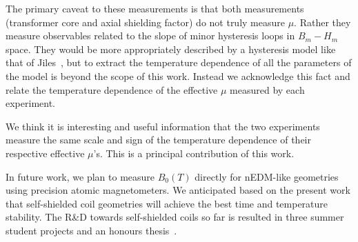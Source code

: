 The primary caveat to these measurements is that both measurements
(transformer core and axial shielding factor) do not truly measure
$\mu$.  Rather they measure observables related to the slope of minor
hysteresis loops in $B_m-H_m$ space.  They would be more appropriately
described by a hysteresis model like that of
Jiles~\cite{jiles1994frequency}, but to extract the temperature
dependence of all the parameters of the model is beyond the scope of
this work.  Instead we acknowledge this fact and relate the
temperature dependence of the effective $\mu$ measured by each
experiment.

We think it is interesting and useful information that the two
experiments measure the same scale and sign of the temperature
dependence of their respective effective $\mu$'s.  This is a principal
contribution of this work.

In future work, we plan to measure $B_0(T)$ directly for nEDM-like
geometries using precision atomic magnetometers.  We anticipated based
on the present work that self-shielded coil geometries will achieve
the best time and temperature stability. The R\&D towards
self-shielded coils so far is resulted in three summer student
projects and an honours thesis~\cite{Rosie_thesis}.















